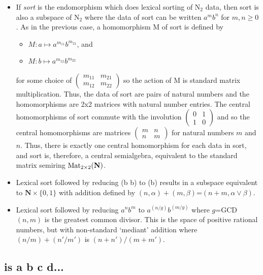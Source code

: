 \documentclass[11pt]{article}
\begin{document}
\begin{itemize}
\item{If {\it sort} is the endomorphism which does lexical sorting of N$_2$ data, then sort is also a subspace of N$_2$ where the 
data of sort can be written $a^m b^n$ for $m,n\ge 0$.  As in the previous case, a homomorphism M of sort is defined by  
\begin{itemize}
\item [] $M: a\mapsto a^{m_{11}} b^{m_{21}}$, and 
\item [] $M: b\mapsto a^{m_{12}} b^{m_{22}}$ 
\end{itemize}
for some choice of 
$
\left (
\begin{array}{cc} 
m_{11} & m_{21} \\ m_{12} & m_{22}  
\end{array}
\right ) 
$
so the action of M is standard matrix multiplication.  Thus, the data of sort are pairs of natural numbers and the 
homomorphisms are 2x2 matrices with natural number entries.  The central homomorphisms of sort 
commute with the involution 
$
\left (
\begin{array}{cc} 
0 & 1 \\ 1 & 0 
\end{array}
\right ) 
$
and so the central homomorphisms are matrices 
$
\left (
\begin{array}{cc} 
m & n \\ n & m 
\end{array}
\right ) 
$
for natural numbers $m$ and $n$.  Thus, there is exactly one central homomorphism for each data in sort, 
and sort is, therefore, a central semialgebra, equivalent to the standard matrix semiring ${\rm Mat}_{2\times2}(\mathbf N)$.
}

\item{Lexical sort followed by reducing (b b) to (b) results in a subspace equivalent to $\mathbf N\times\{0,1\}$ with addition
defined by $(n,\alpha)+(m,\beta)$=$(n+m,\alpha\vee\beta)$.}

\item{Lexical sort followed by reducing $a^n b^m$ to $a^{(n/g)} b^{(m/g)}$ where $g$=GCD$(n,m)$ is the greatest common divisor.  
This is the space of positive rational numbers, but with non-standard `mediant' addition where $(n/m)+(n'/m')$ is $(n+n')/(m+m')$\cite{mediant}.}

\end{itemize}

\subsection{is a b c d...} 
\end{document}
